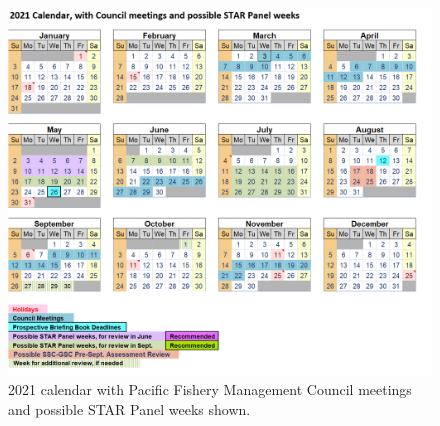 \documentclass[11pt,
  english,
  a4paper,
]{article}
\begin{document}
\leavevmode\tagmcend\tagstructend


\begin{figure}
\centering
\includegraphics[width=1\textwidth,height=1\textheight]{figs/assessment_calendar.png}
\caption{2021 calendar with Pacific Fishery Management Council meetings and possible STAR Panel weeks shown.\label{fig:calendar}}
\end{figure}

\tagmcend\tagstructend
\end{document}
